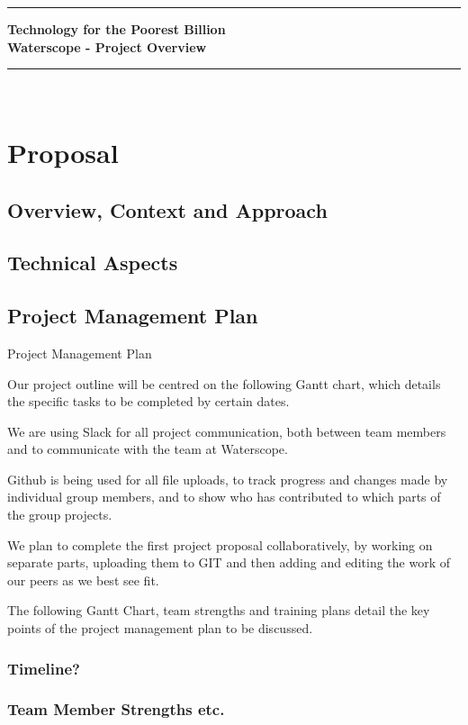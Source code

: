 \documentclass[12pt]{article}
\begin{document}
\noindent
\rule{15.7cm}{0.5mm}


\begin{center}
{\bf Technology for the Poorest Billion}\\
\vspace{0.5cm} {\bf Waterscope - Project Overview}\\
\end{center}
\rule{15.7cm}{0.5mm}

\hfill\\
\section{Proposal}
\subsection{Overview, Context and Approach}

\subsection{Technical Aspects}

\subsection{Project Management Plan}
Project Management Plan

Our project outline will be centred on the following Gantt chart, which details the specific tasks to be completed by certain dates. 

We are using Slack for all project communication, both between team members and to communicate with the team at Waterscope. 

Github is being used for all file uploads, to track progress and changes made by individual group members, and to show who has contributed to which parts of the group projects.

We plan to complete the first project proposal collaboratively, by working on separate parts, uploading them to GIT and then adding and editing the work of our peers as we best see fit.


The following Gantt Chart, team strengths and training plans detail the key points of the project management plan to be discussed.
\subsubsection{Timeline?}

\subsubsection{Team Member Strengths etc.}
\end{document}

